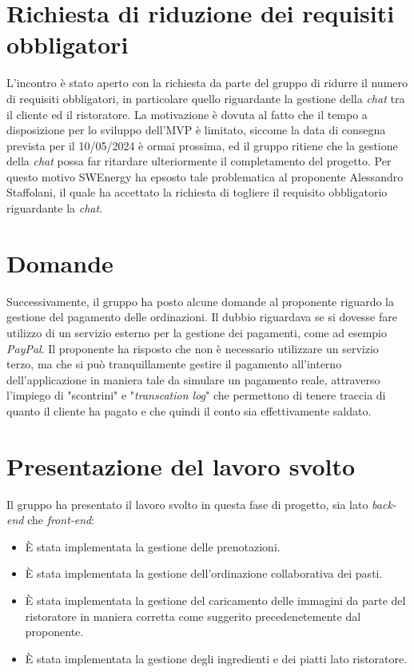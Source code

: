 \section{Richiesta di riduzione dei requisiti obbligatori }
L'incontro è stato aperto con la richiesta da parte del gruppo di ridurre il numero di requisiti obbligatori, in particolare quello riguardante la gestione della \textit{chat} tra il cliente ed il ristoratore.
La motivazione è dovuta al fatto che il tempo a disposizione per lo sviluppo dell'MVP è limitato, siccome la data di consegna prevista per il 10/05/2024 è ormai prossima, ed il gruppo ritiene che la gestione della \textit{chat} possa far ritardare ulteriormente il completamento del progetto.
Per questo motivo SWEnergy ha epsosto tale problematica al proponente Alessandro Staffolani, il quale ha accettato la richiesta di togliere il requisito obbligatorio riguardante la \textit{chat}.

\section{Domande}
Successivamente, il gruppo ha posto alcune domande al proponente riguardo la gestione del pagamento delle ordinazioni. Il dubbio riguardava se si dovesse fare utilizzo di
un servizio esterno per la gestione dei pagamenti, come ad esempio \textit{PayPal}. Il proponente ha risposto che non è necessario utilizzare un servizio terzo, 
ma che si può tranquillamente gestire il pagamento all'interno dell'applicazione in maniera tale da simulare un pagamento reale, attraverso l'impiego di 
"scontrini" e "\textit{transcation log}" che permettono di tenere traccia di quanto il cliente ha pagato e che quindi il conto sia effettivamente saldato.  


\section{Presentazione del lavoro svolto}
Il gruppo ha presentato il lavoro svolto in questa fase di progetto, sia lato \textit{back-end} che \textit{front-end}:
\begin{itemize}
    \item È stata implementata la gestione delle prenotazioni.
    \item È stata implementata la gestione dell'ordinazione collaborativa dei pasti.
    \item È stata implementata la gestione del caricamento delle immagini da parte del ristoratore in maniera corretta come suggerito precedenetemente dal proponente.
    \item È stata implementata la gestione degli ingredienti e dei piatti lato ristoratore.
\end{itemize}

